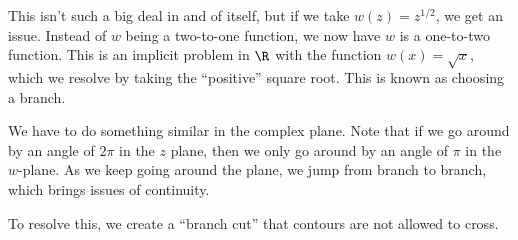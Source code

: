 \documentclass[10pt]{mypackage}
\begin{document}
This isn't such a big deal in and of itself, but if we take $w(z) = z^{1/2}$, we get an issue. Instead of $w$ being a two-to-one function, we now have $w$ is a one-to-two function. This is an implicit problem in $\R$ with the function $w(x) =\sqrt{x}$, which we resolve by taking the ``positive'' square root. This is known as choosing a branch.\newline

We have to do something similar in the complex plane. Note that if we go around by an angle of $2\pi$ in the $z$ plane, then we only go around by an angle of $\pi$ in the $w$-plane. As we keep going around the plane, we jump from branch to branch, which brings issues of continuity.\newline

To resolve this, we create a ``branch cut'' that contours are not allowed to cross. 
\end{document}
